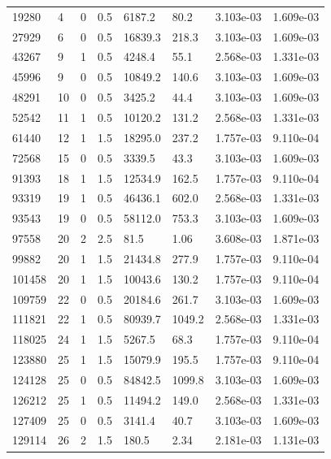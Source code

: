 \documentclass[preview]{standalone}
\begin{document}
{{\begin{tabular}{L{1.2cm}C{1.2cm} C{0.3cm}C{0.5cm} C{1.4cm}C{1.4cm} C{1.4cm}C{1.4cm}}
  19280  &     4  & 0     & 0.5 &  6187.2  & 80.2  & 3.103e-03 &  1.609e-03   \\ 
  27929  &     6  & 0     & 0.5 &  16839.3  & 218.3  & 3.103e-03 &  1.609e-03   \\ 
  43267  &     9  & 1     & 0.5 &  4248.4  & 55.1  & 2.568e-03 &  1.331e-03   \\ 
  45996  &     9  & 0     & 0.5 &  10849.2  & 140.6  & 3.103e-03 &  1.609e-03   \\ 
  48291  &    10  & 0     & 0.5 &  3425.2  & 44.4  & 3.103e-03 &  1.609e-03   \\ 
  52542  &    11  & 1     & 0.5 &  10120.2  & 131.2  & 2.568e-03 &  1.331e-03   \\ 
  61440  &    12  & 1     & 1.5 &  18295.0  & 237.2  & 1.757e-03 &  9.110e-04   \\ 
  72568  &    15  & 0     & 0.5 &  3339.5  & 43.3  & 3.103e-03 &  1.609e-03   \\ 
  91393  &    18  & 1     & 1.5 &  12534.9  & 162.5  & 1.757e-03 &  9.110e-04   \\ 
  93319  &    19  & 1     & 0.5 &  46436.1  & 602.0  & 2.568e-03 &  1.331e-03   \\ 
  93543  &    19  & 0     & 0.5 &  58112.0  & 753.3  & 3.103e-03 &  1.609e-03   \\ 
  97558  &    20  & 2     & 2.5 &  81.5  & 1.06  & 3.608e-03 &  1.871e-03   \\ 
  99882  &    20  & 1     & 1.5 &  21434.8  & 277.9  & 1.757e-03 &  9.110e-04   \\ 
  101458  &    20  & 1     & 1.5 &  10043.6  & 130.2  & 1.757e-03 &  9.110e-04   \\ 
  109759  &    22  & 0     & 0.5 &  20184.6  & 261.7  & 3.103e-03 &  1.609e-03   \\ 
  111821  &    22  & 1     & 0.5 &  80939.7  & 1049.2  & 2.568e-03 &  1.331e-03   \\ 
  118025  &    24  & 1     & 1.5 &  5267.5  & 68.3  & 1.757e-03 &  9.110e-04   \\ 
  123880  &    25  & 1     & 1.5 &  15079.9  & 195.5  & 1.757e-03 &  9.110e-04   \\ 
  124128  &    25  & 0     & 0.5 &  84842.5  & 1099.8  & 3.103e-03 &  1.609e-03   \\ 
  126212  &    25  & 1     & 0.5 &  11494.2  & 149.0  & 2.568e-03 &  1.331e-03   \\ 
  127409  &    25  & 0     & 0.5 &  3141.4  & 40.7  & 3.103e-03 &  1.609e-03   \\ 
  129114  &    26  & 2     & 1.5 &  180.5  & 2.34  & 2.181e-03 &  1.131e-03   \\ 

\end{tabular}}}
\end{document}
